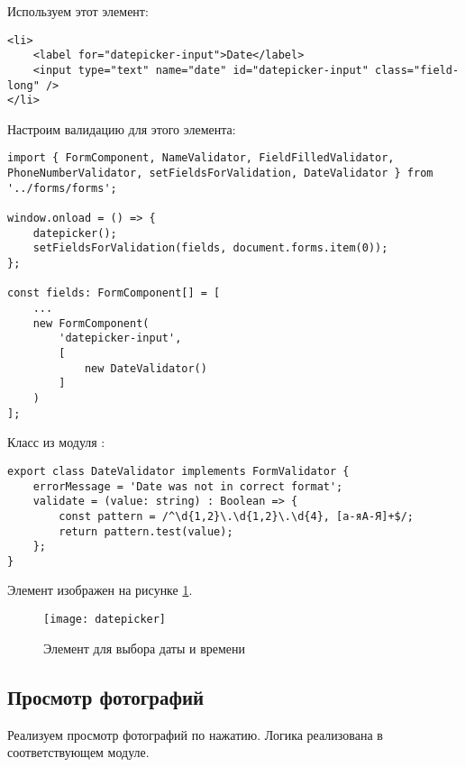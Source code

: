 \documentclass[a4paper,14pt]{extarticle}
\begin{document}
Используем этот элемент:
\begin{lstlisting}
<li>
    <label for="datepicker-input">Date</label>
    <input type="text" name="date" id="datepicker-input" class="field-long" />
</li>
\end{lstlisting}

Настроим валидацию для этого элемента:
\begin{lstlisting}
import { FormComponent, NameValidator, FieldFilledValidator, PhoneNumberValidator, setFieldsForValidation, DateValidator } from '../forms/forms';

window.onload = () => {
    datepicker();
    setFieldsForValidation(fields, document.forms.item(0));
};

const fields: FormComponent[] = [
    ...
    new FormComponent(
        'datepicker-input',
        [
            new DateValidator()
        ]
    )
];
\end{lstlisting}

Класс  из модуля :
\begin{lstlisting}
export class DateValidator implements FormValidator {
    errorMessage = 'Date was not in correct format';
    validate = (value: string) : Boolean => {
        const pattern = /^\d{1,2}\.\d{1,2}\.\d{4}, [а-яА-Я]+$/;
        return pattern.test(value);
    };
}
\end{lstlisting}

Элемент изображен на рисунке \ref{fig:datepicker}.

\begin{figure}[H]
    \centering
    \texttt{[image: datepicker]}
    \caption{Элемент для выбора даты и времени}
    \label{fig:datepicker}
\end{figure}

\subsection{Просмотр фотографий}
Реализуем просмотр фотографий по нажатию. Логика реализована в соответствующем модуле.
\end{document}
